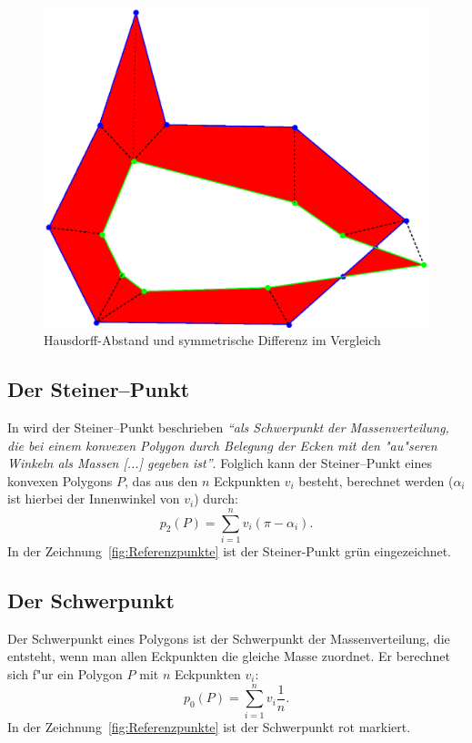 \begin{figure}
	\centering
	\includegraphics[scale=.6]{Metrikengestoert.eps}
	\caption{Hausdorff-Abstand und symmetrische Differenz im Vergleich}
	\label{fig:VergleichMetrik}
\end{figure}


\subsection{Der Steiner--Punkt}\label{Steinerpunkt}

In \cite{Sch} wird der Steiner--Punkt beschrieben \textit{"`als Schwerpunkt der Massenverteilung, die bei einem konvexen Polygon durch Belegung der Ecken mit den "au"seren Winkeln als Massen [...] gegeben ist"'}. Folglich kann der Steiner--Punkt eines konvexen Polygons $P$, das aus den $n$ Eckpunkten $v_i$ besteht, berechnet werden ($\alpha_i$ ist hierbei der Innenwinkel von $v_i$) durch:
\[p_2(P)=\sum^n_{i=1}v_i (\pi-\alpha_i).\]
In der Zeichnung~\vref{fig:Referenzpunkte} ist der Steiner-Punkt grün eingezeichnet.


\subsection{Der Schwerpunkt}\label{Schwerp}

Der Schwerpunkt eines Polygons ist der Schwerpunkt der Massenverteilung, die entsteht, wenn man allen Eckpunkten die gleiche Masse zuordnet. Er berechnet sich f"ur ein Polygon $P$ mit $n$ Eckpunkten $v_i$:
\[p_0(P)=\sum^n_{i=1}v_i \frac{1}{n}.\]
In der Zeichnung~\vref{fig:Referenzpunkte} ist der Schwerpunkt rot markiert. 

